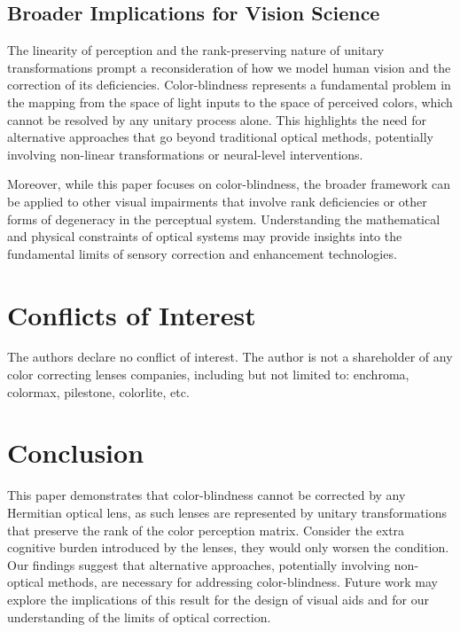 \documentclass[10pt,a4paper]{article}
\theoremstyle{definition}
\theoremstyle{remark}
\numberwithin{equation}{section}
\begin{document}
\subsection{Broader Implications for Vision Science}
The linearity of perception and the rank-preserving nature of unitary transformations prompt a reconsideration of how we model human vision and the correction of its deficiencies. Color-blindness represents a fundamental problem in the mapping from the space of light inputs to the space of perceived colors, which cannot be resolved by any unitary process alone. This highlights the need for alternative approaches that go beyond traditional optical methods, potentially involving non-linear transformations or neural-level interventions.

Moreover, while this paper focuses on color-blindness, the broader framework can be applied to other visual impairments that involve rank deficiencies or other forms of degeneracy in the perceptual system. Understanding the mathematical and physical constraints of optical systems may provide insights into the fundamental limits of sensory correction and enhancement technologies.


\section*{Conflicts of Interest}
The authors declare no conflict of interest. The author is not a shareholder of any color correcting lenses companies, including but not limited to: enchroma, colormax, pilestone, colorlite, etc. 



\section{Conclusion}
This paper demonstrates that color-blindness cannot be corrected by any Hermitian optical lens, as such lenses are represented by unitary transformations that preserve the rank of the color perception matrix. Consider the extra cognitive burden introduced by the lenses, they would only worsen the condition. Our findings suggest that alternative approaches, potentially involving non-optical methods, are necessary for addressing color-blindness. Future work may explore the implications of this result for the design of visual aids and for our understanding of the limits of optical correction.



\end{document}
